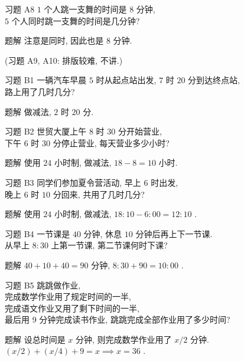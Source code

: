 \documentclass[content.tex]{subfiles}
\begin{document}
\begin{frame}{习题 A8}
$1$ 个人跳一支舞的时间是 $8$ 分钟, \\
$5$ 个人同时跳一支舞的时间是几分钟?
\begin{exampleblock}{题解}
注意是同时, 因此也是 $8$ 分钟.
\end{exampleblock}
\bigbreak
\centering (习题 A9, A10: 排版较难, 不讲.) \\
\end{frame}

\begin{frame}{习题 B1}
一辆汽车早晨 $5$ 时从起点站出发, $7$ 时 $20$ 分到达终点站, \\
路上用了几时几分?
\begin{exampleblock}{题解}
做减法, $2$ 时 $20$ 分.
\end{exampleblock}
\end{frame}

\begin{frame}{习题 B2}
世贸大厦上午 $8$ 时 $30$ 分开始营业, \\
下午 $6$ 时 $30$ 分停止营业, 每天营业多少小时? 
\begin{exampleblock}{题解}
使用 $24$ 小时制, 做减法, $18 - 8 = 10$ 小时.
\end{exampleblock}
\end{frame}

\begin{frame}{习题 B3}
同学们参加夏令营活动, 早上 $6$ 时出发, \\
晚上 $6$ 时 $10$ 分回来, 共用了几时几分?
\begin{exampleblock}{题解}
使用 $24$ 小时制, 做减法, $18:10 - 6:00 = 12:10$ .
\end{exampleblock}
\end{frame}

\begin{frame}{习题 B4}
一节课是 $40$ 分钟, 休息 $10$ 分钟后再上下一节课. \\
从早上 $8:30$ 上第一节课, 第二节课何时下课? 
\begin{exampleblock}{题解}
$40+10+40=90$ 分钟, $8:30 + 90 = 10:00$ .
\end{exampleblock}
\end{frame}

\begin{frame}{习题 B5}
跳跳做作业, \\
完成数学作业用了规定时间的一半, \\
完成语文作业又用了剩下时间的一半, \\
最后用 9 分钟完成读书作业, 跳跳完成全部作业用了多少时间? 
\begin{exampleblock}{题解}
设总时间是 $x$ 分钟, 则完成数学作业用了 $x/2$ 分钟.
$(x/2)+(x/4)+9 = x \implies x = 36$ .
\end{exampleblock}
\end{frame}
\end{document}
